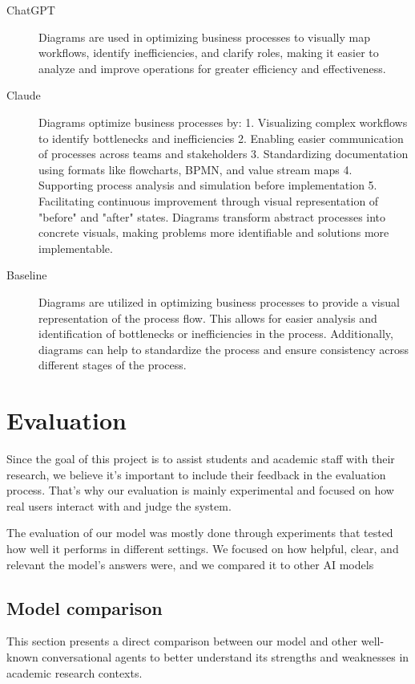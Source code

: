 \documentclass[fleqn,moreauthors,10pt]{ds_report}
\begin{document}
\begin{description}
	\item[ChatGPT] Diagrams are used in optimizing business processes to visually map workflows, identify inefficiencies, and clarify roles, making it easier to analyze and improve operations for greater efficiency and effectiveness.
	\item[Claude] Diagrams optimize business processes by: 1. Visualizing complex workflows to identify bottlenecks and inefficiencies 2. Enabling easier communication of processes across teams and stakeholders 3. Standardizing documentation using formats like flowcharts, BPMN, and value stream maps 4. Supporting process analysis and simulation before implementation 5. Facilitating continuous improvement through visual representation of "before" and "after" states. Diagrams transform abstract processes into concrete visuals, making problems more identifiable and solutions more implementable.
	\item[Baseline] Diagrams are utilized in optimizing business processes to provide a visual representation of the process flow. This allows for easier analysis and identification of bottlenecks or inefficiencies in the process. Additionally, diagrams can help to standardize the process and ensure consistency across different stages of the process.
\end{description}

\section*{Evaluation}

Since the goal of this project is to assist students and academic staff with their research, we believe it’s important to include their feedback in the evaluation process. That’s why our evaluation is mainly experimental and focused on how real users interact with and judge the system.

The evaluation of our model was mostly done through experiments that tested how well it performs in different settings. We focused on how helpful, clear, and relevant the model’s answers were, and we compared it to other AI models


\subsection*{Model comparison}

This section presents a direct comparison between our model and other well-known conversational agents to better understand its strengths and weaknesses in academic research contexts. 
\end{document}
